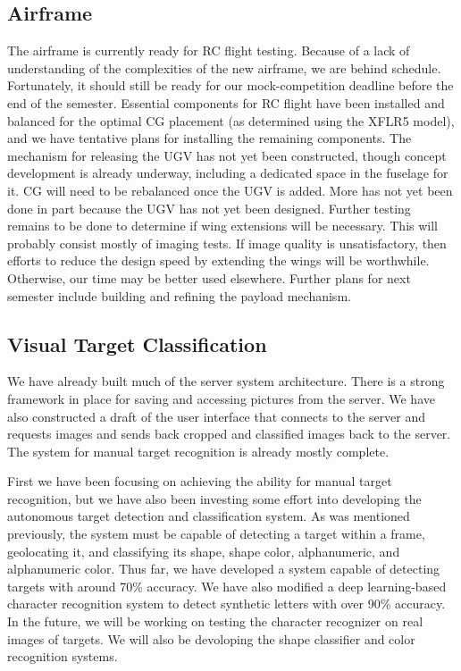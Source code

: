 \documentclass[]{auvsi_doc}
\begin{document}
\subsection{Airframe}
The airframe is currently ready for RC flight testing. Because of a lack of understanding of the complexities of the new airframe, we are behind schedule. Fortunately, it should still be ready for our mock-competition deadline before the end of the semester. Essential components for RC flight have been installed and balanced for the optimal CG placement (as determined using the XFLR5 model), and we have tentative plans for installing the remaining components. The mechanism for releasing the UGV has not yet been constructed, though concept development is already underway, including a dedicated space in the fuselage for it. CG will need to be rebalanced once the UGV is added. More has not yet been done in part because the UGV has not yet been designed. Further testing remains to be done to determine if wing extensions will be necessary. This will probably consist mostly of imaging tests. If image quality is unsatisfactory, then efforts to reduce the design speed by extending the wings will be worthwhile. Otherwise, our time may be better used elsewhere. Further plans for next semester include building and refining the payload mechanism.
\subsection{Visual Target Classification}
We have already built much of the server system architecture. There is a strong framework in place for saving and accessing pictures
from the server. We have also constructed a draft of the user interface that connects to the server and requests images and sends back
cropped and classified images back to the server. The system for manual target recognition is already mostly complete.

First we have been focusing on achieving the ability for manual target recognition, but we have also been investing some effort into developing
the autonomous target detection and classification system. As was mentioned previously, the system must be capable of detecting a target
within a frame, geolocating it, and classifying its shape, shape color, alphanumeric, and alphanumeric color. Thus far, we have developed a
system capable of detecting targets with around 70\% accuracy. We have also modified a deep learning-based character recognition system
to detect synthetic letters with over 90\% accuracy. In the future, we will be working on testing the character recognizer on
real images of targets. We will also be devoloping the shape classifier and color recognition systems.
\end{document}

